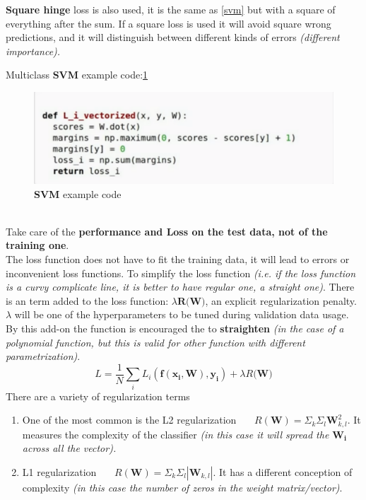 \documentclass[11pt]{article}
\begin{document}
\textbf{Square hinge} loss is also used, it is the same as \ref{svm} but with a square of everything after the sum.
If  a square loss is used it will avoid square wrong predictions, and it will distinguish between different kinds of errors \textit{(different importance).}

\clearpage
Multiclass \textbf{SVM} example code:\ref{fig:L212}
\begin{figure}[h]
\centering
\captionsetup{justification=centering}
\includegraphics[width=0.75\linewidth]{L212.pdf}
\caption{ \textbf{SVM} example code}
\label{fig:L212}
\end{figure}\\
Take care of the \textbf{performance and Loss on the test data, not of the training one}.\\
The loss function does not have to fit the training data, it will lead to errors or inconvenient loss functions. To simplify the loss function \textit{(i.e. if the loss function is a curvy complicate line, it is better to have regular one, a straight one)}.  There is an term added to the loss function:  $\lambda \textbf{R(W)}$, an explicit regularization penalty. $\lambda$ will be one of the hyperparameters to be tuned during validation data usage.
By this add-on the  function is encouraged the to \textbf{straighten} \textit{(in the case of a polynomial function, but this is valid for other function with different parametrization)}.
\begin{equation}
      L= \frac{1}{N}\sum_{i} L_i (\mathbf{f(x_i,W),y_i})+\lambda R\textbf{(W)}
\end{equation}{}
There are a variety of regularization terms \label{norm}
\begin{enumerate}
    \item One of the most common is the L2 regularization \ \ \   $ R(\mathbf{W}) = \Sigma_k \Sigma_l \mathbf{W}_{k,l}^2$. It measures the complexity of the classifier \textit{(in this case it will spread the $\mathbf{W_i}$ across all the vector).}
      \item L1 regularization \ \ \   $ R(\mathbf{W}) = \Sigma_k \Sigma_l |\mathbf{W}_{k,l}|$.  It has a different conception of complexity \textit{(in this case the number of zeros in the weight matrix/vector)}.
\end{enumerate}{}
\end{document}
